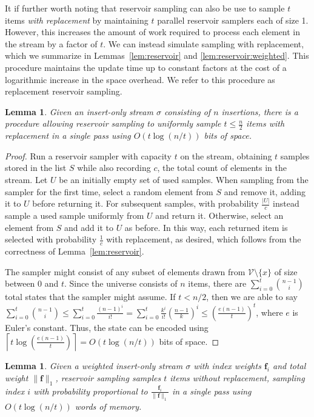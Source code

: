 \documentclass[10]{report}
\newtheorem{lemma}[theorem]{Lemma}
\begin{document}
It if further worth noting that reservoir sampling can also be use to sample $t$ items \emph{with replacement} by maintaining $t$ parallel reservoir samplers each of size 1. 
However, this increases the amount of work required to process each element in the stream by a factor of $t$.
We can instead simulate sampling with replacement, which we summarize in Lemmas~\ref{lem:reservoir} and \ref{lem:reservoir:weighted}.
This procedure maintains the update time up to constant factors at the cost of a logarithmic increase in the space overhead.
We refer to this procedure as replacement reservoir sampling.
%
\begin{lemma} \label{lem:reservoir:replacement}
Given an insert-only stream $\sigma$ consisting of $n$ insertions, there is a procedure allowing reservoir sampling to uniformly sample $t \leq \frac{n}{2}$ items with replacement in a single pass using $O(t\log(n/t))$ bits of space. 
\end{lemma}
%
\begin{proof}
Run a reservoir sampler with capacity $t$ on the stream, obtaining $t$ samples stored in the list $S$ while also recording $c$, the total count of elements in the stream.
Let $U$ be an initially empty set of used samples. 
When sampling from the sampler for the first time, select a random element from $S$ and remove it, adding it to $U$ before returning it.
For subsequent samples, with probability $\frac{|U|}{c}$ instead sample a used sample uniformly from $U$ and return it.
Otherwise, select an element from $S$ and add it to $U$ as before.
In this way, each returned item is selected with probability $\frac{1}{c}$ with replacement, as desired, which follows from the correctness of Lemma~\ref{lem:reservoir}.

The sampler might consist of any subset of elements drawn from $\mathcal{V} \setminus \{x\}$ of size between 0 and $t$. 
Since the universe consists of $n$ items, there are $\sum_{i=0}^t {n-1 \choose i}$ total states that the sampler might assume. 
If $t < n/2$, then we are able to say 
$\sum_{i=0}^t {n-1 \choose i} \leq \sum_{i=0}^t \frac{(n-1)^i}{i!} = \sum_{i=0}^t \frac{k^i}{i!} \left ( \frac{n-1}{k} \right )^i \leq \left ( \frac{e(n-1)}{t} \right )^t$, where $e$ is Euler's constant.
Thus, the state can be encoded using $\left \lceil t \log \left ( \frac{e(n-1)}{t} \right ) \right \rceil = O(t\log(n/t))$ bits of space.
\end{proof}
%
\begin{lemma} \label{lem:reservoir:weighted:replacement}
Given a weighted insert-only stream $\sigma$ with index weights $\mathbf{f}_i$ and total weight $\|\mathbf{f}\|_1$, reservoir sampling samples $t$ items without replacement, sampling index $i$ with probability proportional to $\frac{\mathbf{f}_i}{\|\mathbf{f}\|_1}$ in a single pass using $O(t\log (n/t))$ words of memory. 
\end{lemma}
\end{document}
